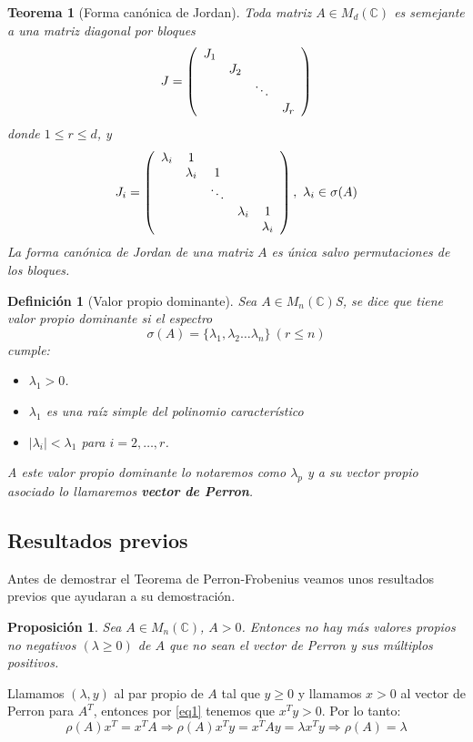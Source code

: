 \documentclass[size=a4, parskip=half, titlepage=false, toc=flat, toc=bib, 12pt]{scrartcl}
\makeatletter
\renewenvironment{proof}[1][\proofname] {\par\pushQED{\qed}\normalfont\topsep6\p@\@plus6\p@\relax\trivlist\item[\hskip\labelsep\itshape\tgpaella#1\@addpunct{.}]\ignorespaces}{\popQED\endtrivlist\@endpefalse}
\theoremstyle{theorem-style}
\newtheorem{nth}{Teorema}[section]
\newtheorem{nprop}{Proposición}[section]
\theoremstyle{definition-style}
\newtheorem{ndef}{Definición}[section]
\theoremstyle{remark-style}
\theoremstyle{example-style}
\theoremstyle{definition-style}
\theoremstyle{remark-style}
\makeatother
\begin{document}
\begin{nth}[Forma canónica de Jordan]
Toda matriz $A \in M_d(\mathbb{C})$ es semejante a una matriz diagonal por bloques
$$J = \left(
      \begin{array}{{cccc}}
        J_1   &           &         &     \\
              &    J_2    &         &     \\
              &           & \ddots  &     \\
              &           &         & J_r
      \end{array}
\right)$$
donde $1 \leq r \leq d$, y
$$J_i = \left(
      \begin{array}{{ccccc}}
        \lambda_i   &   1       &         &    & \\
              &    \lambda_i    &    1     &    & \\
              &           & \ddots  &     & \\
              &           &         & \lambda_i & 1 \\
              &           &         &           & \lambda_i
      \end{array}
\right), \ \lambda_i \in \sigma(A)$$
La forma canónica de Jordan de una matriz $A$ es única salvo permutaciones de los bloques.
\end{nth}

\begin{ndef}[Valor propio dominante]
Sea $A \in M_n(\mathbb{C})$S, se dice que tiene valor propio dominante si el espectro
$$\sigma (A) = \{ \lambda_1, \lambda_2 \dots \lambda_n \} \   (r \leq n)$$
cumple:
\begin{itemize}
\item $\lambda_1 > 0$.
\item $\lambda_1$ es una raíz simple del polinomio característico
\item $|\lambda_i| < \lambda_1$ para $i = 2, \dots , r$.
\end{itemize}
A este valor propio dominante lo notaremos como $\lambda_p$ y a su vector propio asociado lo llamaremos \textbf{vector de Perron}.
\end{ndef}

\newpage

\subsection{Resultados previos}

Antes de demostrar el Teorema de Perron-Frobenius veamos unos resultados previos que ayudaran a su demostración.
\begin{nprop}
\label{nomasvalores}
Sea $A \in M_n(\mathbb{C})$, $A> 0$. Entonces no hay más valores propios no negativos $(\lambda \geq 0)$ de $A$ que no sean el vector de Perron y sus múltiplos positivos.
\end{nprop}
\begin{proof}
Llamamos $(\lambda, y)$ al par propio de $A$ tal que $y \geq 0$ y llamamos $x > 0$ al vector de Perron para $A^T$, entonces por \ref{eq1} tenemos que $x^T y > 0$. Por lo tanto:
$$\rho(A)x^T = x^T A \Rightarrow \rho(A)x^Ty = x^T A y = \lambda x^T y \Rightarrow \rho(A) = \lambda $$
\end{proof}
\end{document}
